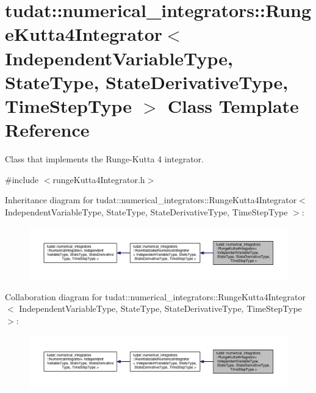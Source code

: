 \hypertarget{classtudat_1_1numerical__integrators_1_1RungeKutta4Integrator}{}\section{tudat\+:\+:numerical\+\_\+integrators\+:\+:Runge\+Kutta4\+Integrator$<$ Independent\+Variable\+Type, State\+Type, State\+Derivative\+Type, Time\+Step\+Type $>$ Class Template Reference}
\label{classtudat_1_1numerical__integrators_1_1RungeKutta4Integrator}


Class that implements the Runge-\/\+Kutta 4 integrator.  




{\ttfamily \#include $<$runge\+Kutta4\+Integrator.\+h$>$}



Inheritance diagram for tudat\+:\+:numerical\+\_\+integrators\+:\+:Runge\+Kutta4\+Integrator$<$ Independent\+Variable\+Type, State\+Type, State\+Derivative\+Type, Time\+Step\+Type $>$\+:
\nopagebreak
\begin{figure}[H]
\begin{center}
\leavevmode
\includegraphics[width=350pt]{classtudat_1_1numerical__integrators_1_1RungeKutta4Integrator__inherit__graph}
\end{center}
\end{figure}


Collaboration diagram for tudat\+:\+:numerical\+\_\+integrators\+:\+:Runge\+Kutta4\+Integrator$<$ Independent\+Variable\+Type, State\+Type, State\+Derivative\+Type, Time\+Step\+Type $>$\+:
\nopagebreak
\begin{figure}[H]
\begin{center}
\leavevmode
\includegraphics[width=350pt]{classtudat_1_1numerical__integrators_1_1RungeKutta4Integrator__coll__graph}
\end{center}
\end{figure}
